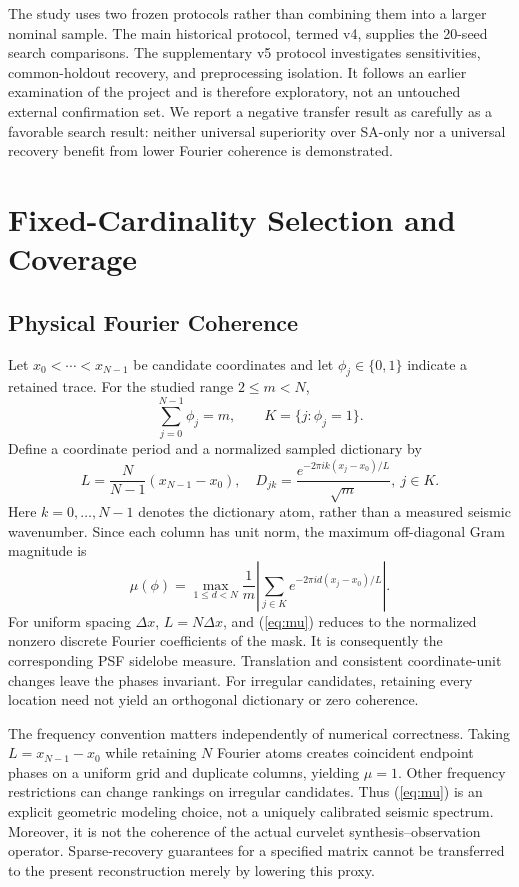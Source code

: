 \documentclass[journal]{IEEEtran}
\begin{document}
The study uses two frozen protocols rather than combining them into a larger nominal sample. The main historical protocol, termed v4, supplies the 20-seed search comparisons. The supplementary v5 protocol investigates sensitivities, common-holdout recovery, and preprocessing isolation. It follows an earlier examination of the project and is therefore exploratory, not an untouched external confirmation set. We report a negative transfer result as carefully as a favorable search result: neither universal superiority over SA-only nor a universal recovery benefit from lower Fourier coherence is demonstrated.

\section{Fixed-Cardinality Selection and Coverage}
\subsection{Physical Fourier Coherence}
Let $x_0<\cdots<x_{N-1}$ be candidate coordinates and let $\phi_j\in\{0,1\}$ indicate a retained trace. For the studied range $2\leq m<N$,
\begin{equation}
\sum_{j=0}^{N-1}\phi_j=m,\qquad K=\{j:\phi_j=1\}.
\label{eq:count}
\end{equation}
Define a coordinate period and a normalized sampled dictionary by
\begin{equation}
L=\frac{N}{N-1}(x_{N-1}-x_0),\quad
D_{jk}=\frac{e^{-2\pi i k(x_j-x_0)/L}}{\sqrt m},\ j\in K.
\end{equation}
Here $k=0,\ldots,N-1$ denotes the dictionary atom, rather than a measured seismic wavenumber. Since each column has unit norm, the maximum off-diagonal Gram magnitude is
\begin{equation}
\mu(\phi)=\max_{1\leq d<N}\frac1m
\left|\sum_{j\in K}e^{-2\pi i d(x_j-x_0)/L}\right|.
\label{eq:mu}
\end{equation}
For uniform spacing $\Delta x$, $L=N\Delta x$, and (\ref{eq:mu}) reduces to the normalized nonzero discrete Fourier coefficients of the mask. It is consequently the corresponding PSF sidelobe measure. Translation and consistent coordinate-unit changes leave the phases invariant. For irregular candidates, retaining every location need not yield an orthogonal dictionary or zero coherence.

The frequency convention matters independently of numerical correctness. Taking $L=x_{N-1}-x_0$ while retaining $N$ Fourier atoms creates coincident endpoint phases on a uniform grid and duplicate columns, yielding $\mu=1$. Other frequency restrictions can change rankings on irregular candidates. Thus (\ref{eq:mu}) is an explicit geometric modeling choice, not a uniquely calibrated seismic spectrum. Moreover, it is not the coherence of the actual curvelet synthesis--observation operator. Sparse-recovery guarantees for a specified matrix \cite{candes} cannot be transferred to the present reconstruction merely by lowering this proxy.
\end{document}
